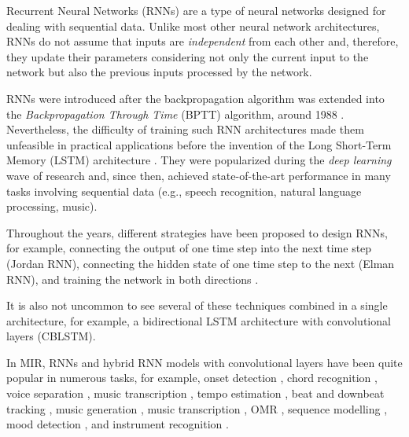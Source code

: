 

Recurrent Neural Networks (RNNs) are a type of neural
networks designed for dealing with sequential data. Unlike
most other neural network architectures, RNNs do not assume
that inputs are \emph{independent} from each other and,
therefore, they update their parameters considering not only
the current input to the network but also the previous
inputs processed by the network.

RNNs were introduced after the backpropagation algorithm
\parencite{rumelhart1988learning} was extended into the
\emph{Backpropagation Through Time} (BPTT) algorithm, around
1988 \parencite{werbos1988generalization,
werbos1990backpropagation}. Nevertheless, the difficulty of
training such RNN architectures made them unfeasible in
practical applications before the invention of the Long
Short-Term Memory (LSTM) architecture
\parencite{hochreiter1997long}. They were popularized during
the \emph{deep learning} wave of research and, since then,
achieved state-of-the-art performance in many tasks
involving sequential data (e.g., speech recognition, natural
language processing, music).

Throughout the years, different strategies have been
proposed to design RNNs, for example, connecting the output
of one time step into the next time step (Jordan RNN),
connecting the hidden state of one time step to the next
(Elman RNN), and training the network in both directions
\parencite{schuster1997bidirectional}.

It is also not uncommon to see several of these techniques
combined in a single architecture, for example, a
bidirectional LSTM architecture with convolutional layers
(CBLSTM).

In MIR, RNNs and hybrid RNN models with convolutional layers
have been quite popular in numerous tasks, for example,
onset detection \parencite{eyben2010universal}, chord
recognition \parencite{boulangerlewandowski2013audio,
sigtia2016endend, sears2018evaluating}, voice separation
\parencite{huang2014singingvoice}, music transcription
\parencite{sigtia2014rnnbased}, tempo estimation
\parencite{bock2015accurate}, beat and downbeat tracking
\parencite{bock2016joint, krebs2016downbeat}, music
generation \parencite{liu2016predicting, liang2017automatic,
lim2017chord}, music transcription
\parencite{rigaud2016singing, sigtia2016endend,
southall2016automatic, vogl2016recurrent,
southall2017automatic, vogl2017drum, basaran2018main}, OMR
\parencite{calvozaragoza2017onestep, wel2017optical,
calvozaragoza2018cameraprimus}, sequence modelling
\parencite{ycart2017study}, mood detection
\parencite{delbouys2018music}, and instrument recognition
\parencite{gururani2018instrument}.



